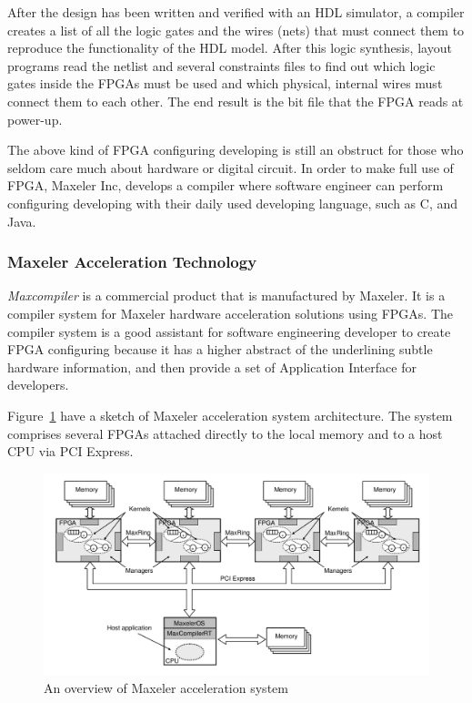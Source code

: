 After the design has been written and verified with an HDL simulator,
a compiler creates a list of all the logic gates and the wires (nets)
that must connect them to reproduce the functionality of the HDL model.
After this logic synthesis, layout programs read the netlist and several
constraints files to find out which logic gates inside the FPGAs must
be used and which physical, internal wires must connect them to each
other. The end result is the bit file that the FPGA reads at power-up.

The above kind of FPGA configuring developing is still an obstruct for
those who seldom care much about hardware or digital circuit. In order to
make full use of FPGA, Maxeler Inc, develops a compiler where software
engineer can perform configuring developing with their daily used
developing language, such as C, and Java.

\subsubsection{Maxeler Acceleration Technology}

\emph{Maxcompiler} is a commercial product that is manufactured by Maxeler.
It is a compiler system for Maxeler hardware acceleration solutions using
FPGAs. The compiler system is a good assistant for software engineering
developer to create FPGA configuring because it has a higher abstract of
the underlining subtle hardware information, and then provide a set of
Application Interface for developers.

Figure~\ref{fig:maxeler_acceleration_system} have a sketch of Maxeler
acceleration system architecture. The system comprises several FPGAs
attached directly to the local memory and to a host CPU via PCI Express.

\begin{figure}
  \centering
  \includegraphics[scale=0.35]{img/overview_of_maxeler_acceleration_system.png}
  \caption{An overview of Maxeler acceleration system}
  \label{fig:maxeler_acceleration_system}
\end{figure}

